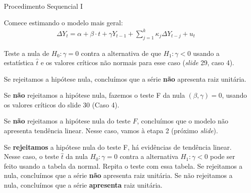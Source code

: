 \documentclass[11pt]{beamer}
\newenvironment{wideenumerate}{\enumerate\addtolength{\itemsep}{10pt}}{\endenumerate}
\newenvironment{halfwideenumerate}{\enumerate\addtolength{\itemsep}{0.5em}}{\endenumerate}
\begin{document}
\begin{frame}{Procedimento Sequencial I}
	\begin{wideenumerate}
		\item Comece estimando o modelo mais geral:
		\begin{equation}
			\begin{aligned}
				\Delta Y_t = \alpha + \beta \cdot t + \gamma Y_{t-1}  +\sum_{j=1}^k \kappa_j\Delta Y_{t-j} + u_t
			\end{aligned}
		\end{equation}
		
		Teste a nula de $H_0: \gamma = 0$ contra a alternativa de que $H_1: \gamma < 0$ usando a estatística $\hat{t}$ e os valores críticos não normais para esse caso (\textit{slide} 29, caso 4).
		\begin{halfwideenumerate}
			\item Se rejeitamos a hipótese nula, concluímos que a série \textbf{não} apresenta raiz unitária.
			\item Se \textbf{não} rejeitamos a hipótese nula, fazemos o teste F da nula $(\beta, \gamma)=0$, usando os valores críticos do slide 30 (Caso 4).
			\begin{halfwideenumerate}
				\item Se \textbf{não} rejeitamos a hipótese  nula do teste $F$, concluímos que o modelo não apresenta tendência linear. Nesse caso, vamos à etapa 2 (próximo \textit{slide}).
				\item Se \textbf{rejeitamos} a hipótese nula do teste F, há evidências de tendência linear. Nesse caso, o teste $\hat{t}$ da nula $H_0: \gamma = 0$ contra a alternativa  $H_1: \gamma < 0$ pode ser feito usando a tabela da normal. Repita o teste com essa tabela. Se rejeitamos a nula, concluímos que a série \textbf{não} apresenta raiz unitária. Se não rejeitamos a nula, concluímos que a série \textbf{apresenta} raiz unitária.
			\end{halfwideenumerate}
		\end{halfwideenumerate}
		
	\end{wideenumerate}
	
\end{frame}
\end{document}

